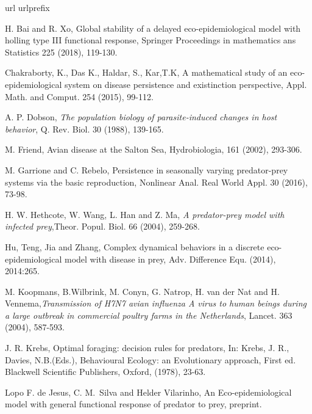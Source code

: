 \documentclass[reqno]{amsart}
\begin{document}
{{%

\begin{thebibliography}{10}
\expandafter\ifx\csname url\endcsname\relax
  \def\url#1{\texttt{#1}}\fi
\expandafter\ifx\csname urlprefix\endcsname\relax\def\urlprefix{URL }\fi

 H. Bai and R. Xo, Global stability of a delayed eco-epidemiological model with holling type III functional response, Springer Proceedings in mathematics ans Statistics 225 (2018), 119-130.

 Chakraborty, K., Das K., Haldar, S., Kar,T.K, A mathematical study of an eco-epidemiological system on disease persistence and existinction perspective, Appl. Math. and Comput. 254 (2015), 99-112.

 A. P. Dobson, \emph{The population biology of parasite-induced changes in host behavior}, Q. Rev. Biol. 30 (1988), 139-165.

 M. Friend, Avian disease at the Salton Sea, Hydrobiologia, 161 (2002), 293-306.

 M. Garrione and C. Rebelo, Persistence in seasonally varying predator-prey systems via the basic reproduction, Nonlinear Anal. Real World Appl. 30 (2016), 73-98.

  H. W. Hethcote, W. Wang, L. Han and Z. Ma, \emph{A predator-prey model with infected prey},Theor. Popul. Biol. 66 (2004), 259-268.

 Hu, Teng, Jia and Zhang, Complex dynamical behaviors in a discrete eco-epidemiological model with disease in prey, Adv. Difference Equ. (2014), 2014:265.

 M. Koopmans, B.Wilbrink, M. Conyn, G. Natrop, H. van der Nat and H. Vennema,\emph{Transmission of H7N7 avian influenza A virus to human beings during a large outbreak in commercial poultry farms in the Netherlands}, Lancet. 363 (2004), 587-593.

 J. R. Krebs, Optimal foraging: decision rules for predators, In: Krebs, J. R., Davies, N.B.(Eds.), Behavioural Ecology: an Evolutionary approach, First ed. Blackwell Scientific Publishers, Oxford, (1978), 23-63.

 Lopo F. de Jesus, C. M.~Silva and Helder Vilarinho, An Eco-epidemiological model with general functional response of predator to prey, preprint.


\end{thebibliography}}}
\end{document}
